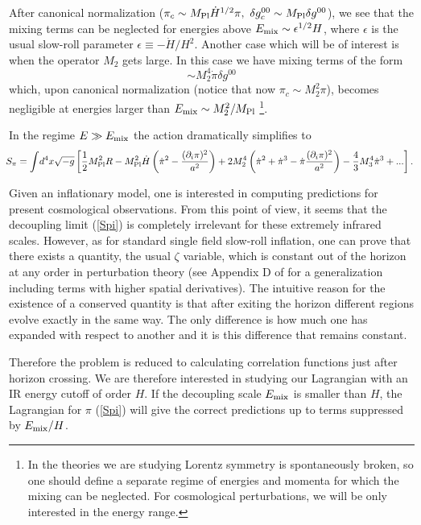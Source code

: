 \documentclass[12pt,letterpaper]{article}
\begin{document}
{After canonical normalization ($\pi_c\sim M_{\rm Pl} \dot H^{1/2}\pi,\  \delta g_c^{00}\sim M_{\rm Pl} \delta g^{00}$), we see that the mixing terms can be neglected for energies above $E_{\rm mix}\sim \epsilon^{1/2} H$, where $\epsilon$ is the usual slow-roll parameter $\epsilon\equiv -\dot H/H^2$.
Another case which will  be of interest is when the operator $M_2$ gets large. In this case we have mixing terms of the form
\begin{equation}
\sim M_2^4 \dot \pi \delta g^{00}
\end{equation}
which, upon canonical normalization (notice that now $\pi_c\sim M_2^2\pi$), becomes negligible at energies larger than $E_{\rm mix}\sim M_2^2/M_{\rm Pl}$ \footnote{In the theories we are studying Lorentz symmetry is spontaneously broken, so one should define a separate regime of energies and momenta for which the mixing can be neglected. For cosmological perturbations, we will be only interested in the energy range.}.

In the regime $E\gg E_{\rm mix}$ the action dramatically simplifies to
\begin{eqnarray}\label{Spi} 
\! \! S_{\rm \pi} = \int \!  d^4 x   \sqrt{- g} \left[\frac12 M_{\rm Pl}^2 R -M^2_{\rm Pl}
\dot{H} \left(\dot\pi^2-\frac{ (\partial_i \pi)^2}{a^2}\right)
+2 M^4_2
\left(\dot\pi^2+\dot{\pi}^3-\dot\pi\frac{(\partial_i\pi)^2}{a^2}
\right) -\frac{4}{3} M^4_3 \dot{\pi}^3+ ... \right].
\end{eqnarray}

Given an inflationary model, one is interested in computing
predictions for present cosmological observations. From this point of
view, it seems that the decoupling limit (\ref{Spi}) is completely
irrelevant for these extremely infrared scales. However, as for
standard single field slow-roll inflation, one can prove that there
exists a quantity, the usual $\zeta$ variable, 
which is constant out of the horizon at any order in perturbation
theory \cite{Salopek:1990jq,Lyth:2004gb} (see Appendix D of \cite{verification} for a
generalization including terms with higher spatial derivatives). The intuitive reason for the existence of a conserved quantity
is that after exiting the horizon different regions evolve exactly in
the same way. The only difference is how much one has expanded with
respect to another and it is this difference that remains constant.

Therefore the problem is reduced to calculating correlation functions just after horizon crossing. We are therefore interested in studying our Lagrangian with an IR energy cutoff of order $H$.  If the decoupling scale $E_{\rm mix}$ is smaller than $H$, the Lagrangian for $\pi$ (\ref{Spi}) will give the correct predictions up to terms suppressed by $E_{\rm mix}/H$. 

}
\end{document}
